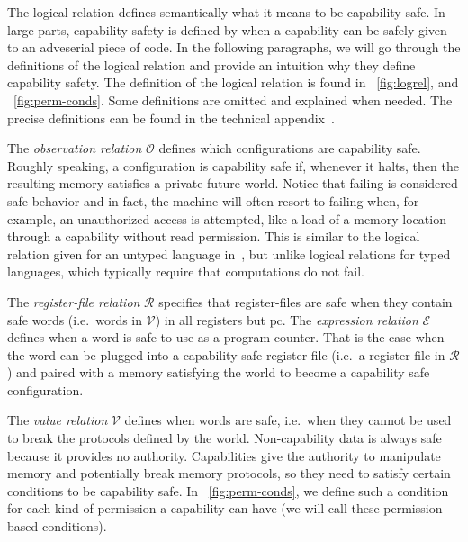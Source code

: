 \documentclass[compsoc,conference,letterpaper,fleqn]{IEEEtran}
\newcommand\dominique[1]{{\color{purple} \sf \footnotesize {DD: #1}}\\}
\newcommand{\pcreg}{\mathrm{pc}}
\newcommand{\asmType}{\plaindom{AsmType}}
\newcommand{\plaindom}[1]{\mathrm{#1}}
\newcommand{\intr}[2]{\mathcal{#1}}
\newcommand{\valueintr}[1]{\intr{V}{#1}}
\newcommand{\exprintr}[1]{\intr{E}{#1}}
\newcommand{\regintr}[1]{\intr{R}{#1}}
\newcommand{\stdvr}{\valueintr{\asmType}}
\newcommand{\stder}{\exprintr{\asmType}}
\newcommand{\stdrr}{\regintr{\asmType}}
\newcommand{\observations}{\mathcal{O}}
\begin{document}
The logical relation defines semantically what it
means to be capability safe.
In large parts, capability safety is defined by when a capability
can be safely given to an adveserial piece of code. In the following paragraphs,
we will go through the definitions of the logical relation and provide an
intuition why they define capability safety. The definition of the logical
relation is found in \figurename~\ref{fig:logrel}, and \figurename~\ref{fig:perm-conds}.
Some definitions are omitted and explained when needed. The precise definitions
can be found in the technical appendix~\cite{technical_appendix}.

The \emph{observation relation} $\observations$ defines which configurations
are capability safe. Roughly speaking, a configuration is capability safe if,
whenever it halts, then the resulting memory satisfies a private future world.
Notice that failing is considered safe behavior and in fact, the machine will
often resort to failing when, for example, an unauthorized
access is attempted, like a load of a memory location through a
capability without read permission. This is similar to the logical relation
given for an untyped language in~\cite{Devriese:2016ObjCap}, but unlike logical
relations for typed languages, which typically require that computations do not
fail.

The \emph{register-file relation} $\stdrr$ specifies that register-files are
safe when they contain safe words (i.e.\ words in $\stdvr$) in all registers but
$\pcreg$. The \emph{expression relation} $\stder$ defines when a word is safe
to use as a program counter. That is the case when the word can be plugged into
a capability safe register file (i.e.\ a register file in $\stdrr$) and paired
with a memory satisfying the world to become a capability safe configuration.

The \emph{value relation} $\stdvr$ defines when words are safe, i.e.\ when they
cannot be used to break the protocols defined by the world. Non-capability data
is always safe because it provides no authority. Capabilities give the authority
to manipulate memory and potentially break memory protocols, so they need to
satisfy certain conditions to be capability safe. In
\figurename~\ref{fig:perm-conds}, we define such a condition for each kind of
permission a capability can have (we will call these permission-based
conditions).
\end{document}
